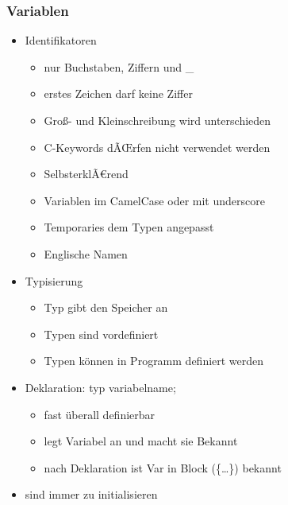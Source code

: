 \documentclass[10pt,a5paper]{article}
\begin{document}
\subsubsection{Variablen}
\begin{itemize}
\item Identifikatoren\begin{itemize}
\item nur Buchstaben, Ziffern und \_ 
\item erstes Zeichen darf keine Ziffer
\item Groß- und Kleinschreibung wird unterschieden
\item C-Keywords dÃŒrfen nicht verwendet werden
\item SelbsterklÃ€rend
\item Variablen im CamelCase oder mit underscore
\item Temporaries dem Typen angepasst
\item Englische Namen
\end{itemize}
\item Typisierung \begin{itemize}
\item Typ gibt den Speicher an
\item Typen sind vordefiniert
\item Typen können in Programm definiert werden
\end{itemize}
\item Deklaration: typ variabelname; \begin{itemize}
\item fast überall definierbar
\item legt Variabel an und macht sie Bekannt
\item nach Deklaration ist Var in Block (\{\dots\}) bekannt
\end{itemize}
\item sind immer zu initialisieren
\end{itemize}
\end{document}
